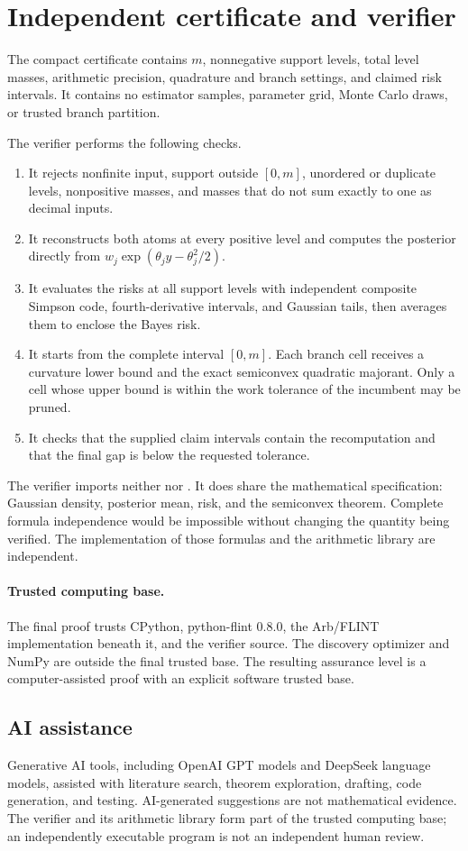 \section{Independent certificate and verifier}
\label{sec:verifier}

The compact certificate contains $m$, nonnegative support levels, total level
masses, arithmetic precision, quadrature and branch settings, and claimed
risk intervals.  It contains no estimator samples, parameter grid, Monte
Carlo draws, or trusted branch partition.

The verifier performs the following checks.

\begin{enumerate}
\item It rejects nonfinite input, support outside $[0,m]$, unordered or
duplicate levels, nonpositive masses, and masses that do not sum exactly to
one as decimal inputs.
\item It reconstructs both atoms at every positive level and computes the
posterior directly from
$w_j\exp(\theta_jy-\theta_j^2/2)$.
\item It evaluates the risks at all support levels with independent composite
Simpson code, fourth-derivative intervals, and Gaussian tails, then averages
them to enclose the Bayes risk.
\item It starts from the complete interval $[0,m]$.  Each branch cell receives
a curvature lower bound and the exact semiconvex quadratic majorant.
Only a cell whose upper bound is within the work tolerance of the incumbent
may be pruned.
\item It checks that the supplied claim intervals contain the recomputation
and that the final gap is below the requested tolerance.
\end{enumerate}

The verifier imports neither  nor
.  It does share the mathematical specification:
Gaussian density, posterior mean, risk, and the semiconvex theorem.  Complete
formula independence would be impossible without changing the quantity being
verified.  The implementation of those formulas and the arithmetic library
are independent.

\paragraph{Trusted computing base.}
The final proof trusts CPython, python-flint 0.8.0, the Arb/FLINT
implementation beneath it, and the verifier source.  The discovery optimizer
and NumPy are outside the final trusted base.  The resulting assurance level
is a computer-assisted proof with an explicit software trusted base.

\subsection{AI assistance}
Generative AI tools, including OpenAI GPT models and DeepSeek language models,
assisted with literature search, theorem exploration, drafting, code generation,
and testing. AI-generated suggestions are not mathematical evidence. The verifier and its arithmetic
library form part of the trusted computing base; an independently executable
program is not an independent human review.
